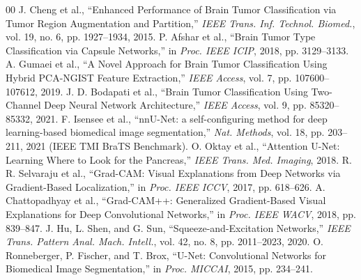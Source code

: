 \documentclass[conference]{IEEEtran}
\begin{document}
\begin{thebibliography}{00}
 J. Cheng et al., ``Enhanced Performance of Brain Tumor Classification via Tumor Region Augmentation and Partition,'' \emph{IEEE Trans. Inf. Technol. Biomed.}, vol. 19, no. 6, pp. 1927--1934, 2015.
 P. Afshar et al., ``Brain Tumor Type Classification via Capsule Networks,'' in \emph{Proc. IEEE ICIP}, 2018, pp. 3129--3133.
 A. Gumaei et al., ``A Novel Approach for Brain Tumor Classification Using Hybrid PCA-NGIST Feature Extraction,'' \emph{IEEE Access}, vol. 7, pp. 107600--107612, 2019.
 J. D. Bodapati et al., ``Brain Tumor Classification Using Two-Channel Deep Neural Network Architecture,'' \emph{IEEE Access}, vol. 9, pp. 85320--85332, 2021.
 F. Isensee et al., ``nnU-Net: a self-configuring method for deep learning-based biomedical image segmentation,'' \emph{Nat. Methods}, vol. 18, pp. 203--211, 2021 (IEEE TMI BraTS Benchmark).
 O. Oktay et al., ``Attention U-Net: Learning Where to Look for the Pancreas,'' \emph{IEEE Trans. Med. Imaging}, 2018.
 R. R. Selvaraju et al., ``Grad-CAM: Visual Explanations from Deep Networks via Gradient-Based Localization,'' in \emph{Proc. IEEE ICCV}, 2017, pp. 618--626.
 A. Chattopadhyay et al., ``Grad-CAM++: Generalized Gradient-Based Visual Explanations for Deep Convolutional Networks,'' in \emph{Proc. IEEE WACV}, 2018, pp. 839--847.
 J. Hu, L. Shen, and G. Sun, ``Squeeze-and-Excitation Networks,'' \emph{IEEE Trans. Pattern Anal. Mach. Intell.}, vol. 42, no. 8, pp. 2011--2023, 2020.
 O. Ronneberger, P. Fischer, and T. Brox, ``U-Net: Convolutional Networks for Biomedical Image Segmentation,'' in \emph{Proc. MICCAI}, 2015, pp. 234--241.
\end{thebibliography}
\end{document}
